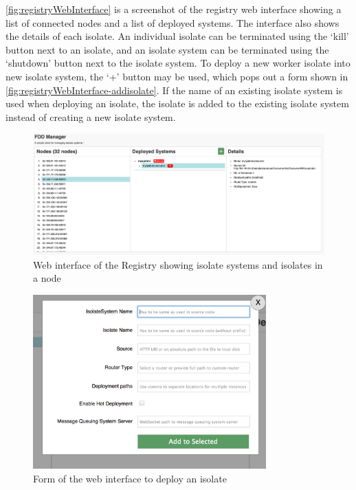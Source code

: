   \autoref{fig:registryWebInterface} is a screenshot of the registry web interface showing a list of connected nodes and a list of deployed systems. The interface also shows the details of each isolate. An individual isolate can be terminated using the ‘kill’ button next to an isolate, and an isolate system can be terminated using the ‘shutdown’ button next to the isolate system. To deploy a new worker isolate into new isolate system, the ‘+’ button may be used, which pops out a form shown in \autoref{fig:registryWebInterface-addisolate}. If the name of an existing isolate system is used when deploying an isolate, the isolate is added to the existing isolate system instead of creating a new isolate system.

\begin{figure}[H]
  \centering
  \includegraphics[width=1\textwidth]{figures/webinterface}
  \caption[Web interface of the Registry showing isolate systems and isolates in a node]{Web interface of the Registry showing isolate systems and isolates in a node}
  \label{fig:registryWebInterface}
\end{figure}

\begin{figure}[H]
  \centering  \includegraphics[width=0.8\textwidth]{figures/webinterface-addisolate}
  \caption[Form of the web interface to deploy an isolate]{Form of the web interface to deploy an isolate}
  \label{fig:registryWebInterface-addisolate}
\end{figure}

